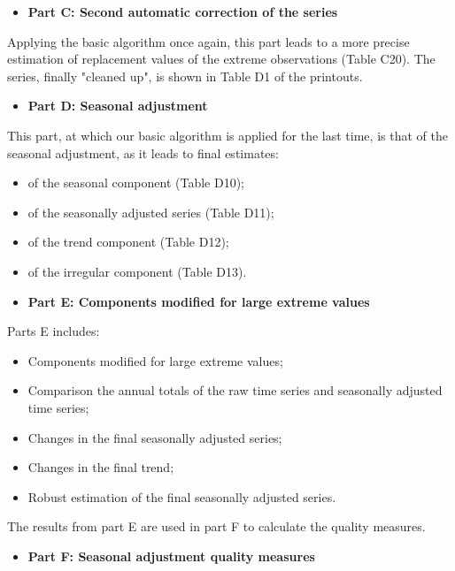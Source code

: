 \documentclass[
]{book}
\providecommand{\tightlist}{%
  \setlength{\itemsep}{0pt}\setlength{\parskip}{0pt}}
\begin{document}
\begin{itemize}
\tightlist
\item
  \textbf{Part C: Second automatic correction of the series}
\end{itemize}

Applying the basic algorithm once again, this part leads to a more
precise estimation of replacement values of the extreme observations
(Table C20). The series, finally "cleaned up", is shown in Table D1 of
the printouts.

\begin{itemize}
\tightlist
\item
  \textbf{Part D: Seasonal adjustment}
\end{itemize}

This part, at which our basic algorithm is applied for the last time, is
that of the seasonal adjustment, as it leads to final estimates:

\begin{itemize}
\item
  of the seasonal component (Table D10);
\item
  of the seasonally adjusted series (Table D11);
\item
  of the trend component (Table D12);
\item
  of the irregular component (Table D13).
\end{itemize}

\begin{itemize}
\tightlist
\item
  \textbf{Part E: Components modified for large extreme values}
\end{itemize}

Parts E includes:

\begin{itemize}
\item
  Components modified for large extreme values;
\item
  Comparison the annual totals of the raw time series and seasonally adjusted time series;
\item
  Changes in the final seasonally adjusted series;
\item
  Changes in the final trend;
\item
  Robust estimation of the final seasonally adjusted series.
\end{itemize}

The results from part E are used in part F to calculate the quality measures.

\begin{itemize}
\tightlist
\item
  \textbf{Part F: Seasonal adjustment quality measures}
\end{itemize}
\end{document}
